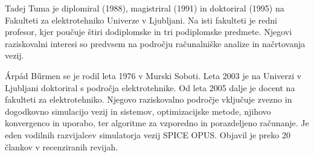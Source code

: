 \documentclass[journal,a4paper,twoside]{template/IEEEtran}
\begin{document}
\begin{IEEEbiographynophoto}{Tadej Tuma} je diplomiral (1988), magistriral (1991) in doktoriral (1995) na Fakulteti za elektrotehniko Univerze v Ljubljani. Na isti fakulteti je redni profesor, kjer poučuje štiri dodiplomske in tri podiplomske predmete. Njegovi raziskovalni interesi so predvsem na področju računalniške analize in načrtovanja vezij.
\end{IEEEbiographynophoto}

\begin{IEEEbiographynophoto}{\'{A}rp\'{a}d B\H{u}rmen} se je rodil leta 1976 v Murski Soboti. Leta 2003 je na Univerzi v Ljubljani doktoriral s področja elektrotehnike. Od leta 2005 dalje je docent na fakulteti za elektrotehniko. Njegovo raziskovalno področje vključuje zvezno in dogodkovno simulacijo vezij in sistemov, optimizacijske metode, njihovo konvergenco in uporabo, ter algoritme za vzporedno in porazdeljeno računanje. Je eden vodilnih razvijalcev simulatorja vezij SPICE OPUS. Objavil je preko 20 člankov v recenziranih revijah.
\end{IEEEbiographynophoto}

\vfill

\label{finish}

\end{document}
